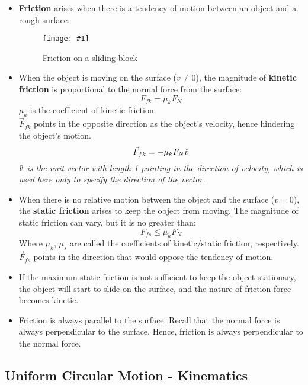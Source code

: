 \documentclass[11pt]{article}
\newcommand{\fig}[4]{
    \begin{figure}[H]
        \centering
        \texttt{[image: \#1]}
        \caption{#2}
        \label{exp4fit}
    \end{figure}
}
\theoremstyle{gangnamstyle}{\newtheorem{definition}{Definition}[]}
\theoremstyle{gangnamstyle}{\newtheorem{example}{Example}[]}
\theoremstyle{gangnamstyle}{\newtheorem{problem}{Problem}[]}
\begin{document}
\begin{itemize}
\item \textbf{Friction} arises when there is a tendency of motion between an object and a rough surface. 

\fig{figs/0627/friction.png}{Friction on a sliding block}{0.5}{0}

\item When the object is moving on the surface ($v \neq 0$), the magnitude of \textbf{kinetic friction} is proportional to the normal force from the surface: 
\[ F_{fk} = \mu_k F_N \]
$\mu_k$ is the coefficient of kinetic friction. \\ 
$\Vec{F}_{fk}$ points in the opposite direction as the object's velocity, hence hindering the object's motion. 
\[ \Vec{F}_{fk} = - \mu_k F_N \Hat{v} \]
\textit{$\Hat{v}$ is the unit vector with length 1 pointing in the direction of velocity, which is used here only to specify the direction of the vector.}

\item When there is no relative motion between the object and the surface ($v = 0$), the \textbf{static friction} arises to keep the object from moving. The magnitude of static friction can vary, but it is no greater than: 
\[ F_{fs} \leq \mu_k F_N \]
Where $\mu_k$, $\mu_s$ are called the coefficients of kinetic/static friction, respectively. $\Vec{F}_{fs}$ points in the direction that would oppose the tendency of motion. 

\item If the maximum static friction is not sufficient to keep the object stationary, the object will start to slide on the surface, and the nature of friction force becomes kinetic. 

\item Friction is always parallel to the surface. Recall that the normal force is always perpendicular to the surface. Hence, friction is always perpendicular to the normal force. 
\end{itemize}

\subsection{Uniform Circular Motion - Kinematics}
\end{document}
